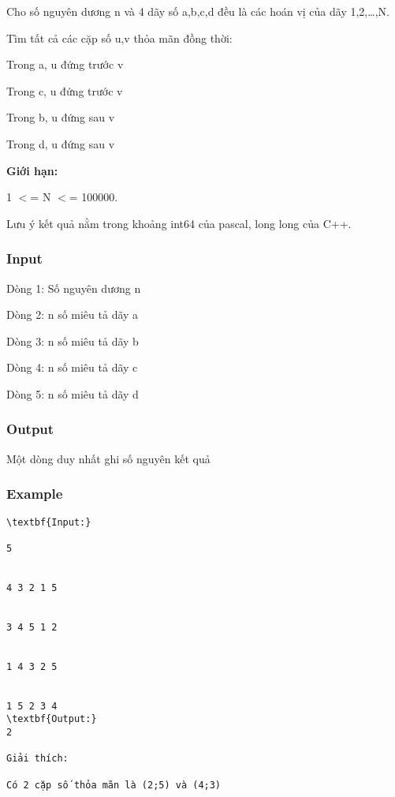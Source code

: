 



   Cho số nguyên dương n và 4 dãy số a,b,c,d đều là các hoán vị của dãy 1,2,…,N.  

   Tìm tất cả các cặp số u,v thỏa mãn đồng thời:  

   Trong a, u đứng trước v  

   Trong c, u đứng trước v  

   Trong b, u đứng sau v  

   Trong d, u đứng sau v  

\textbf{    Giới hạn:   }

   1 $<$= N $<$= 100000.  

   Lưu ý kết quả nằm trong khoảng int64 của pascal, long long của C++.  

\subsubsection{   Input  }

   Dòng 1: Số nguyên dương n  

   Dòng 2: n số miêu tả dãy a  

   Dòng 3: n số miêu tả dãy b  

   Dòng 4: n số miêu tả dãy c  

   Dòng 5: n số miêu tả dãy d  

\subsubsection{   Output  }

   Một dòng duy nhất ghi số nguyên kết quả  

\subsubsection{   Example  }
\begin{verbatim}
\textbf{Input:}

5


4 3 2 1 5


3 4 5 1 2


1 4 3 2 5


1 5 2 3 4
\textbf{Output:}
2

Giải thích: 

Có 2 cặp số thỏa mãn là (2;5) và (4;3)\end{verbatim}